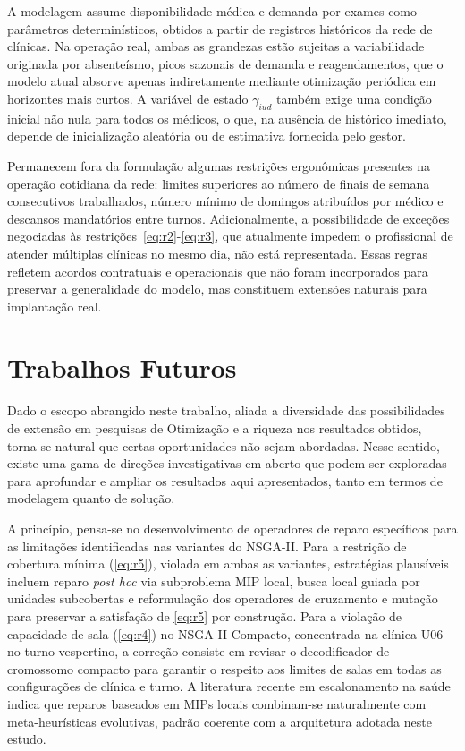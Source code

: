 A modelagem assume disponibilidade médica e demanda por exames como parâmetros determinísticos, obtidos a partir de registros históricos da rede de clínicas. Na operação real, ambas as grandezas estão sujeitas a variabilidade originada por absenteísmo, picos sazonais de demanda e reagendamentos, que o modelo atual absorve apenas indiretamente mediante otimização periódica em horizontes mais curtos. A variável de estado $\gamma_{iud}$ também exige uma condição inicial não nula para todos os médicos, o que, na ausência de histórico imediato, depende de inicialização aleatória ou de estimativa fornecida pelo gestor.

Permanecem fora da formulação algumas restrições ergonômicas presentes na operação cotidiana da rede: limites superiores ao número de finais de semana consecutivos trabalhados, número mínimo de domingos atribuídos por médico e descansos mandatórios entre turnos. Adicionalmente, a possibilidade de exceções negociadas às restrições~\eqref{eq:r2}-\eqref{eq:r3}, que atualmente impedem o profissional de atender múltiplas clínicas no mesmo dia, não está representada. Essas regras refletem acordos contratuais e operacionais que não foram incorporados para preservar a generalidade do modelo, mas constituem extensões naturais para implantação real.

\section{Trabalhos Futuros}

Dado o escopo abrangido neste trabalho, aliada a diversidade das possibilidades de extensão em pesquisas de Otimização e a riqueza nos resultados obtidos, torna-se natural que certas oportunidades não sejam abordadas. Nesse sentido, existe uma gama de direções investigativas em aberto que podem ser exploradas para aprofundar e ampliar os resultados aqui apresentados, tanto em termos de modelagem quanto de solução.

A princípio, pensa-se no desenvolvimento de operadores de reparo específicos para as limitações identificadas nas variantes do NSGA-II. Para a restrição de cobertura mínima (\ref{eq:r5}), violada em ambas as variantes, estratégias plausíveis incluem reparo \textit{post hoc} via subproblema MIP local, busca local guiada por unidades subcobertas e reformulação dos operadores de cruzamento e mutação para preservar a satisfação de \ref{eq:r5} por construção. Para a violação de capacidade de sala (\ref{eq:r4}) no NSGA-II Compacto, concentrada na clínica U06 no turno vespertino, a correção consiste em revisar o decodificador de cromossomo compacto para garantir o respeito aos limites de salas em todas as configurações de clínica e turno. A literatura recente em escalonamento na saúde \cite{Turhan_Bilgen_2020,Wickert_Kummer_Neto_Boniatti_Buriol_2021} indica que reparos baseados em MIPs locais combinam-se naturalmente com meta-heurísticas evolutivas, padrão coerente com a arquitetura adotada neste estudo.

